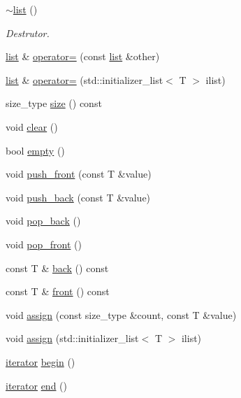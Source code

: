 \begin{DoxyCompactItemize}
\mbox{\label{classsc_1_1list_a3399256b9e2fa57bee383c2421722214}} 
\hyperlink{classsc_1_1list_a3399256b9e2fa57bee383c2421722214}{$\sim$list} ()
\begin{DoxyCompactList}\small\item\em Destrutor. \end{DoxyCompactList}\item 
\hyperlink{classsc_1_1list}{list} \& \hyperlink{classsc_1_1list_abc045e02a12cec8bf19c90c909b3a735}{operator=} (const \hyperlink{classsc_1_1list}{list} \&other)
\item 
\hyperlink{classsc_1_1list}{list} \& \hyperlink{classsc_1_1list_a51c75e5f78c7bb99631e954bf5510918}{operator=} (std\+::initializer\+\_\+list$<$ T $>$ ilist)
\item 
size\+\_\+type \hyperlink{classsc_1_1list_a0fe585f3f9e33058294c3a590c7bfdea}{size} () const
\item 
void \hyperlink{classsc_1_1list_aece86319a40d15b88fd1a981ba1a226e}{clear} ()
\item 
bool \hyperlink{classsc_1_1list_a8599ccd8f27e0f39a1c3051cd9d05bdb}{empty} ()
\item 
void \hyperlink{classsc_1_1list_a24a7b8a81765dfe0351ddb263bc6d754}{push\+\_\+front} (const T \&value)
\item 
void \hyperlink{classsc_1_1list_a1d77cdaeacca7959989873617a753c96}{push\+\_\+back} (const T \&value)
\item 
void \hyperlink{classsc_1_1list_a3d6fc0a4f2c1db7c74af5a482c1a03ca}{pop\+\_\+back} ()
\item 
void \hyperlink{classsc_1_1list_ab3fbf66643f4356cf0c1947bd4fdf48e}{pop\+\_\+front} ()
\item 
const T \& \hyperlink{classsc_1_1list_a4835abb7fb3362c357d534db60e0ba6e}{back} () const
\item 
const T \& \hyperlink{classsc_1_1list_a5e27dee267cd155aaeb87698a2f63da5}{front} () const
\item 
void \hyperlink{classsc_1_1list_a5c8aa119bd13c2a577e4ab6ba339c12e}{assign} (const size\+\_\+type \&count, const T \&value)
\item 
void \hyperlink{classsc_1_1list_a495ac9f4a80b40ba7d37e6badf24445f}{assign} (std\+::initializer\+\_\+list$<$ T $>$ ilist)
\item 
\hyperlink{classsc_1_1list_1_1iterator}{iterator} \hyperlink{classsc_1_1list_a2fa015e137583d7142933500b34f1e29}{begin} ()
\item 
\hyperlink{classsc_1_1list_1_1iterator}{iterator} \hyperlink{classsc_1_1list_a48429f0cf3d990fa6dfd5140e6aa95a7}{end} ()

\end{DoxyCompactItemize}
